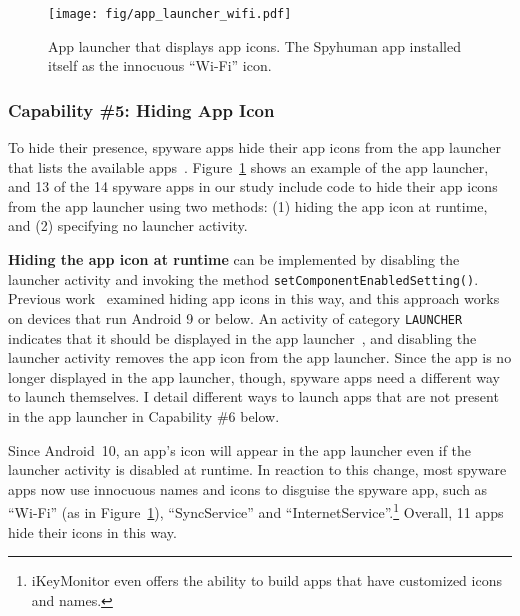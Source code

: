 \begin{figure}[t]
\centering
\texttt{[image: fig/app\_launcher\_wifi.pdf]}
\caption[App Launcher Example]{App launcher that displays app icons.
The Spyhuman app installed itself as the innocuous ``Wi-Fi'' icon.}
\label{fig:app_launcher}
\end{figure}

\subsubsection*{Capability \#5: Hiding App Icon}
\label{subsubsec:hide_icon}
To hide their presence,
spyware apps hide their app icons from the app launcher that lists the available
apps~\cite{whataret1:online}. Figure~\ref{fig:app_launcher} shows an example of
the app launcher, and 13 of the 14 spyware apps in our study include code to hide their
app icons from the app launcher using two methods:
(1) hiding the app icon at runtime, and (2) specifying no launcher activity.

\textbf{Hiding the app icon at runtime} can be implemented by disabling the
launcher activity and invoking the method \texttt{setComponentEnabledSetting()}.  Previous work~\cite{shan2018self} examined hiding
app icons in this way, and this approach works on devices that run
Android 9 or below. An activity of category \texttt{LAUNCHER}
indicates that it should be displayed in the app
launcher~\cite{IntentAn33:online}, and disabling the launcher activity
removes the app icon from the app launcher.  Since the app is no
longer displayed in the app launcher, though, spyware apps need a
different way to launch themselves. I detail different ways to launch
apps that are not present in the app launcher in Capability \#6 below.

Since Android~10, an app's icon will appear in the app launcher even
if the launcher activity is disabled at runtime. In reaction to this
change, most spyware apps now use innocuous names and icons to
disguise the spyware app, such as ``Wi-Fi'' (as in Figure~\ref{fig:app_launcher}), ``SyncService'' and
``InternetService''.\footnote{iKeyMonitor even offers the ability to
  build apps that have customized icons and names.} Overall, 11 apps hide their icons in this way.


